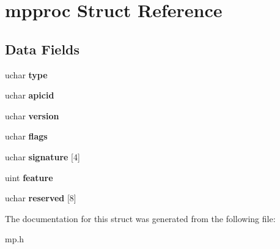\hypertarget{structmpproc}{}\section{mpproc Struct Reference}
\label{structmpproc}
\subsection*{Data Fields}
\begin{DoxyCompactItemize}
\item 
\mbox{\label{structmpproc_acd7371100bf5624c8eafe1280826f358}} 
uchar {\bfseries type}
\item 
\mbox{\label{structmpproc_a935db2a1561da721c867f4b82c51d04d}} 
uchar {\bfseries apicid}
\item 
\mbox{\label{structmpproc_a6d7948bc046404527c0eec71e3e93209}} 
uchar {\bfseries version}
\item 
\mbox{\label{structmpproc_abac8cdeb6e601ce8e5bf343c8efb3680}} 
uchar {\bfseries flags}
\item 
\mbox{\label{structmpproc_a2e18fc2c01b252da2c0d671fdce95eb5}} 
uchar {\bfseries signature} \mbox{[}4\mbox{]}
\item 
\mbox{\label{structmpproc_a62dc15542eee0797a4636b701439b6d9}} 
uint {\bfseries feature}
\item 
\mbox{\label{structmpproc_a94bbb1f4794bcf6126fb36520f668134}} 
uchar {\bfseries reserved} \mbox{[}8\mbox{]}
\end{DoxyCompactItemize}


The documentation for this struct was generated from the following file\+:\begin{DoxyCompactItemize}
\item 
mp.\+h\end{DoxyCompactItemize}
